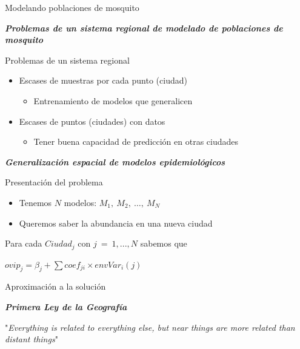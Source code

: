 \documentclass[10pt]{beamer}
\newcommand\IncrFont{\fontsize{20}{20}\selectfont}
\begin{document}
\begin{frame}{Modelando poblaciones de mosquito}
  \IncrFont
  \begin{center}
    \textit{\textbf{Problemas de un sistema regional de modelado de poblaciones de mosquito}}
  \end{center}
\end{frame}





\begin{frame}{Problemas de un sistema regional}
  \begin{itemize}[<+->]
    \item Escases de muestras por cada punto (ciudad)
    \begin{itemize}
      \item Entrenamiento de modelos que generalicen
    \end{itemize}
    \item Escases de puntos (ciudades) con datos
    \begin{itemize}
      \item Tener buena capacidad de predicción en otras ciudades
    \end{itemize}

  \end{itemize}
\end{frame}


\begin{frame}{}
  \IncrFont
  \begin{center}
    \textit{\textbf{Generalización espacial de modelos epidemiológicos}}
  \end{center}
\end{frame}


\begin{frame}{Presentación del problema}
  \begin{itemize}[<+->]
    \item Tenemos $N$ modelos: $M_{1},\ M_{2},\ \dots,\ M_{N}$
    \item Queremos saber la abundancia en una nueva ciudad
  \end{itemize}
  \pause

  Para cada $Ciudad_{j}$ con $j\ =\ 1, ..., N$ sabemos que
  \begin{center}
    $ovip_{j} = \beta_{j} + \sum{}{coef_{ji} \times envVar_{i}(j)}$
  \end{center}
\end{frame}

\begin{frame}{Aproximación a la solución}
  \begin{center}
    \fontsize{15}{15}\selectfont
    \textbf{\textit{Primera Ley de la Geografía}}
  \end{center}
  "\textit{Everything is related to everything else, but near things are more related
  than distant things}"
\end{frame}
\end{document}
